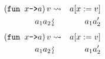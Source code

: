 \documentclass{beamer}
\newcommand{\assign}{:=}
\newcommand{\downsquigarrow}{{\mbox{\rotatebox[origin=c]{-90}{$\rightsquigarrow$}}}}
\newcommand{\tmverbatim}[1]{\text{{\ttfamily{#1}}}}
\begin{document}
{\hlstd{ \ \ \ }}{\hlopt{ \ \ \ \ \ \textbar }}{}{\hlopt{(}}{}{\hlopt{, }}{}{\hlopt{) -> }}{}{\hlopt{+ }}{\hlopt{(}}{}{\hlopt{(}}{}{}{\hlopt{->}}{\hlendline{}}\\
{\hlstd{ \ \ \ \ \ }}{}{}{}{\hlendline{}}\\
{\hlstd{ \ \ \ \ \ \ \ }}{\hlopt{ \ \ \ \ \ \textbar }}{}{\hlopt{-> }}{}{\hlendline{}}\\
{\hlstd{ \ \ \ }}{\hlopt{ \ \ \ \ \ \ \ \ \ \textbar }}{}{\hlopt{(}}{}{\hlopt{, }}{}{\hlopt{) -> }}{}{\hlopt{+ }}{}{\hlopt{))}}{}{\hlopt{))}}\\
{\hlopt{ \ \ \ \ \ \ \ (}}{}{\hlopt{(}}{}{\hlopt{,
}}{}{\hlopt{))}}
\begin{eqnarray*}
  \left( \text{\tmverbatim{fun }} x \text{\tmverbatim{->}} a \right) v &
  \rightsquigarrow & a [x \assign v]\\
  a_1 a_2 & \downsquigarrow & a_1 a_2'
\end{eqnarray*}
{\newpage}
\begin{eqnarray*}
  \left( \text{\tmverbatim{fun }} x \text{\tmverbatim{->}} a \right) v &
  \rightsquigarrow & a [x \assign v]\\
  a_1 a_2 & \downsquigarrow & a_1 a_2'
\end{eqnarray*}
{\hlstd{ \ }}{}{\hlopt{+ }}{\hlopt{(}}{}{}{\hlopt{(}}{}{\hlopt{, }}{}{\hlopt{)
}}{}{\hlendline{}}\\
{\hlstd{ \ \ \ \ \ \ \ \ }}{\hlopt{\textbar }}{}{\hlopt{->
}}{}{\hlendline{}}\\
{\hlstd{ \ \ \ }}{\hlopt{ \ \ \ \ \textbar }}{}{\hlopt{(}}{}{\hlopt{, }}{}{\hlopt{) -> }}{}{\hlopt{+ }}{\hlopt{(}}{}{\hlopt{(}}{}{}{\hlopt{->}}{\hlendline{}}\\
{\hlstd{ \ \ \ \ \ }}{}{}{}{\hlendline{}}\\
{\hlstd{ \ \ \ \ \ \ \ }}{\hlopt{ \ \ \ \ \textbar }}{}{\hlopt{->
}}{}{\hlendline{}}\\
{\hlstd{ \ \ \ }}{\hlopt{ \ \ \ \ \ \ \ \ \textbar }}{}{\hlopt{(}}{}{\hlopt{, }}{}{\hlopt{) -> }}{}{\hlopt{+ }}{}{\hlopt{))}}{}{\hlopt{))}}
\end{document}
